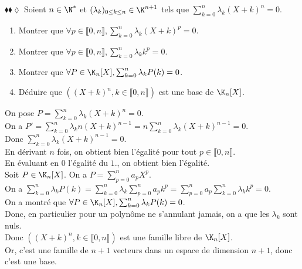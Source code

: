 \documentclass[11pt]{article}
\begin{document}
\begin{exercice}{$\blacklozenge\blacklozenge\lozenge$}{}
    Soient $n\in\N^*$ et $(\lambda_k)_{0\leq k\leq n}\in\K^{n+1}$ tels que $\sum_{k=0}^n\lambda_k(X + k)^n=0$.
    \begin{enumerate}
        \item Montrer que $\forall p \in \llbracket 0, n \rrbracket, \sum_{k=0}^n \lambda_k(X+k)^p=0$.
        \item Montrer que $\forall p \in \llbracket 0, n \rrbracket, \sum_{k=0}^n \lambda_kk^p = 0$.
        \item Montrer que $\forall P \in \K_n[X], \sum_{k=0}^n\lambda_k P(k) = 0$.
        \item Déduire que $\left( (X + k)^n, k \in \llbracket 0, n \rrbracket \right)$ est une base de $\K_n[X]$.
    \end{enumerate}
    \tcblower
    On pose $P = \sum_{k=0}^n \lambda_k(X+k)^n = 0$.\\
     On a $P' = \sum_{k=0}^n \lambda_k n(X+k)^{n-1} = n\sum_{k=0}^n \lambda_k(X+k)^{n-1} = 0$.\\
    Donc $\sum_{k=0}^n \lambda_k(X+k)^{n-1} = 0$.\\
    En dérivant $n$ fois, on obtient bien l'égalité pour tout $p\in\llbracket 0, n\rrbracket$.\\[0.2cm]
     En évaluant en $0$ l'égalité du $\boxed{1.}$, on obtient bien l'égalité.\\[0.2cm]    
     Soit $P\in\K_n[X]$. On a $P = \sum_{p=0}^n a_pX^p$.\\
    On a $\sum_{k=0}^n \lambda_k P(k) = \sum_{k=0}^n \lambda_k \sum_{p=0}^n a_pk^p = \sum_{p=0}^n a_p\sum_{k=0}^n \lambda_kk^p = 0$.\\[0.2cm]
     On a montré que $\forall P\in\K_n[X], \sum_{k=0}^n \lambda_kP(k) = 0$.\\
    Donc, en particulier pour un polynôme ne s'annulant jamais, on a que les $\lambda_k$ sont nuls.\\
    Donc $\left( (X + k)^n, k \in \llbracket 0, n \rrbracket \right)$ est une famille libre de $\K_n[X]$.\\
    Or, c'est une famille de $n+1$ vecteurs dans un espace de dimension $n+1$, donc c'est une base.
\end{exercice}
\end{document}
